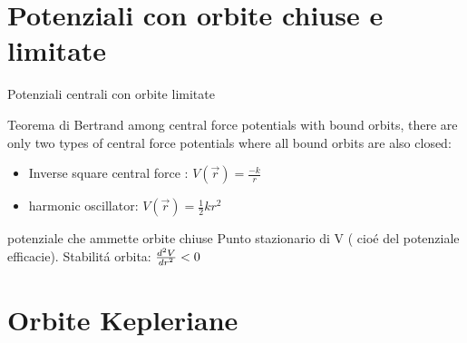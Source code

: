 \section{Potenziali con orbite chiuse e limitate}
\begin{frame}{Potenziali centrali con orbite limitate}
\begin{block}{Teorema di Bertrand}
among central force potentials with bound orbits, there are only two types of central force potentials where all bound orbits are also closed:
\begin{itemize}
\item Inverse square central force : $V(\vec{r})=\frac{-k}{r}$
\item harmonic oscillator: $V(\vec{r})=\frac{1}{2}kr^2$
\end{itemize}
\end{block}
\end{frame}

\begin{wordonframe}{potenziale che ammette orbite chiuse}
Punto stazionario di V ( cio\'e del potenziale efficacie).
Stabilit\'a orbita: $\TtwoDy{r}{V}<0$
\end{wordonframe}

\section{Orbite Kepleriane}

